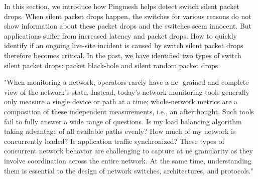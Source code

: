 \documentclass[10pt, journal, letterpaper]{IEEEtran}
\begin{document}
In this section, we introduce how Pingmesh helps detect switch silent packet drops. When silent packet drops happen, the switches for various reasons do not show information about these packet drops and the switches seem innocent. But applications suffer from increased latency and packet drops. How to quickly identify if an ongoing live-site incident is caused by switch silent packet drops therefore becomes critical. In the past, we have identified two types of switch silent packet drops: packet black-hole and silent random packet drops.

\cite{yaseen2018synchronized} "When monitoring a network, operators rarely have a  ne- grained and complete view of the network’s state. Instead, today’s network monitoring tools generally only measure a single device or path at a time; whole-network metrics are a composition of these independent measurements, i.e., an afterthought. Such tools fail to fully answer a wide range of questions. Is my load balancing algorithm taking advantage of all available paths evenly? How much of my network is concurrently loaded? Is application traffic synchronized? These types of concurrent network behavior are challenging to capture at  ne granularity as they involve coordination across the entire network. At the same time, understanding them is essential to the design of network switches, architectures, and protocols."\cite{yaseen2018synchronized}

	

\end{document}

